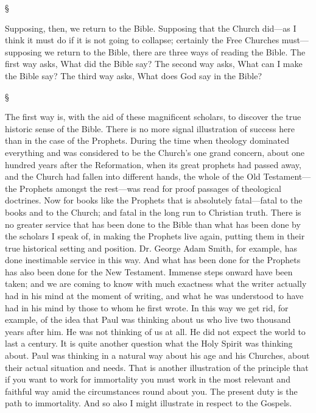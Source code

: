 \documentclass[12pt,letterpaper,oneside]{book}
\begin{document}
\begin{center}
\S
\end{center} 

Supposing, then, we return to the Bible. 
Supposing that the Church did---as I think it 
must do if it is not going to collapse; certainly 
the Free Churches must---supposing we return 
to the Bible, there are three ways of reading the 
Bible. The first way asks, What did the Bible 
say? The second way asks, What can I make 
the Bible say? The third way asks, What does 
God say in the Bible? 

\begin{center}
\S
\end{center} 

The first way is, with the aid of these magnificent 
scholars, to discover the true historic 
sense of the Bible. There is no more signal 
illustration of success here than in the case of 
the Prophets. During the time when theology 
dominated everything and was considered to 
be the Church's one grand concern, about one 
hundred years after the Reformation, when 
its great prophets had passed away, and the 
Church had fallen into different hands, the 
whole of the Old Testament---the Prophets 
amongst the rest---was read for proof passages 
of theological doctrines. Now for books like 
the Prophets that is absolutely fatal---fatal to 
the books and to the Church; and fatal in the 
long run to Christian truth. There is no greater 
service that has been done to the Bible than 
what has been done by the scholars I speak 
of, in making the Prophets live again, putting 
them in their true historical setting and position. 
Dr. George Adam Smith, for example, has done 
inestimable service in this way. And what 
has been done for the Prophets has also been 
done for the New Testament. Immense steps 
onward have been taken; and we are coming 
to know with much exactness what the writer 
actually had in his mind at the moment of 
writing, and what he was understood to have 
had in his mind by those to whom he first 
wrote. In this way we get rid, for example, 
of the idea that Paul was thinking about us 
who live two thousand years after him. He 
was not thinking of us at all. He did not 
expect the world to last a century. It is quite 
another question what the Holy Spirit was 
thinking about. Paul was thinking in a natural 
way about his age and his Churches, about their 
actual situation and needs. That is another 
illustration of the principle that if you want 
to work for immortality you must work in 
the most relevant and faithful way amid the 
circumstances round about you. The present 
duty is the path to immortality. And so also 
I might illustrate in respect to the Gospels. 
\end{document}
